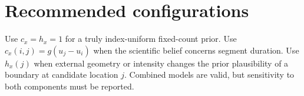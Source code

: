 \section{Recommended configurations}
Use $c_x=h_x=1$ for a truly index-uniform fixed-count prior. Use $c_x(i,j)=g(u_j-u_i)$ when the
scientific belief concerns segment duration. Use $h_x(j)$ when external geometry or intensity
changes the prior plausibility of a boundary at candidate location $j$. Combined models are valid,
but sensitivity to both components must be reported.
